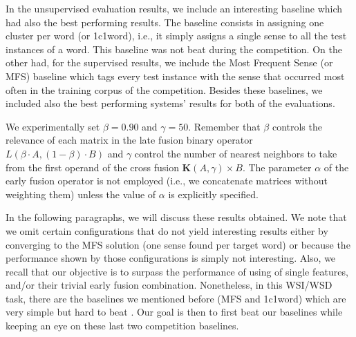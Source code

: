In the unsupervised evaluation results, we include an interesting baseline which had also the best performing results. The baseline consists in assigning one cluster per word (or {1c1word}), i.e., it simply assigns a single sense to all the test instances of a word. This baseline was not beat during the competition. On the other had, for the supervised results, we include the Most Frequent Sense (or MFS) baseline which tags every test instance with the sense that occurred most often in the training corpus of the competition. Besides these baselines, we included also the best performing systems' results for both of the evaluations.


We experimentally set $\beta=0.90$ and $\gamma=50$. Remember that $\beta$ controls the relevance of each matrix in the late fusion binary operator $L(\beta\cdot A, (1-\beta)\cdot B)$ and $\gamma$ control the number of nearest neighbors to take from the first operand of the cross fusion $\mathbf{K}(A,\gamma) \times B$. The parameter $\alpha$ of the early fusion operator is not employed (i.e., we concatenate matrices without weighting them) unless the value of $\alpha$ is explicitly specified.


In the following paragraphs, we will discuss these results obtained. We note that we omit certain configurations that do not yield interesting results either by converging to the MFS solution (one sense found per target word) or because the performance shown by those  configurations is simply not interesting. Also, we recall that our objective is to surpass the performance of using of single features, and/or their trivial early fusion combination. Nonetheless, in this WSI/WSD task, there are the baselines we mentioned before (MFS and 1c1word) which are very simple but hard to beat \cite{Agirre2007}. Our goal is then to first beat our baselines while keeping an eye on these last two competition baselines.

